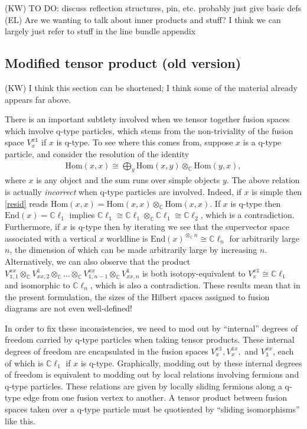\documentclass[12pt,a4paper]{article}
\newcommand{\tp}{\otimes}
\newcommand{\unit}{\mathds{1}}
\newcommand{\cc}{\mathbb{C}}
\newcommand{\Hom}{\text{Hom}}
\newcommand{\End}{\text{End}}
\newcommand{\cl}{\mathbb{C}\ell}
\newcommand{\kw}[1]{{\color{kwcolor}\footnotesize{(KW) #1}}}
\newcommand{\ethan}[1]{{\color{amethyst}\footnotesize{(EL) #1}}}
\begin{document}
\kw{TO DO: discuss reflection structures, pin, etc.
probably just give basic defs}
\ethan{Are we wanting to talk about inner products and stuff? I think we can largely just refer to stuff in the line bundle appendix}


\subsection{Modified tensor product (old version)}

\kw{I think this section can be shortened; I think some of the material already appears far above.}

There is an important subtlety involved when we tensor together fusion spaces which involve q-type particles, which stems from the non-triviality of the fusion space $V^{x\unit}_x$ if $x$ is q-type.
To see where this comes from, suppose $x$ is a q-type particle, and consider the resolution of the identity 
\begin{align} \label{resid}
\Hom(x,x) \cong \bigoplus_y \Hom(x,y) \tp_\cc \Hom(y,x),
\end{align}
where $x$ is any object and the sum runs over simple objects $y$. 
The above relation is actually {\it incorrect} when q-type particles are involved. 
Indeed, if $x$ is simple then \eqref{resid} reads $\Hom(x,x) = \Hom(x,x) \tp_\cc \Hom(x,x).$ 
If $x$ is q-type then $\End(x) = \cl_1$ implies $\cl_1 \cong \cl_1\tp_\cc \cl_1 \cong \cl_2$, which is a contradiction. 
Furthermore, if $x$ is q-type then by iterating we see that the supervector space associated with a vertical $x$ worldline is $\End(x)^{\tp_{\cc} n} \cong \cl_n$ for arbitrarily large $n$, the dimension of which can be made arbitrarily large by increasing $n$. 
Alternatively, we can also observe that the product $V_{\unit,1}^{xx} \tp_\cc V^\unit_{xx,2} \tp_\cc \dots \tp_\cc V_{\unit,n-1}^{xx} \tp_\cc V^\unit_{xx,n}$ is both isotopy-equivalent to $V^{x\unit}_x \cong \cl_1$ and isomorphic to $\cl_n$, which is also a contradiction. 
These results mean that in the present formulation, the sizes of the Hilbert spaces assigned to fusion diagrams are not even well-defined! 

In order to fix these inconsistencies, we need to mod out by ``internal'' degrees of freedom carried by q-type particles when taking tensor products. 
These internal degrees of freedom are encapsulated in the fusion spaces $V^{x\unit}_x, V^{\unit x}_x,$ and $V^{xx}_\unit$, each of which is $\cl_1$ if $x$ is q-type.
Graphically, modding out by these internal degrees of freedom is equivalent to modding out by local relations involving fermions and q-type particles.  
These relations are given by locally sliding fermions along a q-type edge from one fusion vertex to another.
A tensor product between fusion spaces taken over a q-type particle must be quotiented by ``sliding isomorphisms'' like this. 
\end{document}
